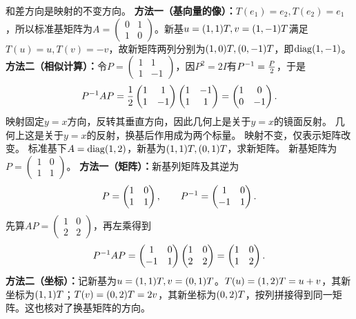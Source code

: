 {和差方向是映射的不变方向。}
{\textbf{方法一（基向量的像）：}$T(e_1)=e_2,T(e_2)=e_1$，所以标准基矩阵为$A=\begin{pmatrix}0&1\\1&0\end{pmatrix}$。新基$u=(1,1)T,v=(1,-1)T$满足$T(u)=u,T(v)=-v$，故新矩阵两列分别为$(1,0)T,(0,-1)T$，即$\operatorname{diag}(1,-1)$。
\textbf{方法二（相似计算）：}令$P=\begin{pmatrix}1&1\\1&-1\end{pmatrix}$，因$P^2=2I$有$P^{-1}=\frac{P}{2}$，于是
\[P^{-1} AP=\dfrac12\begin{pmatrix}1&1\\1&-1\end{pmatrix}
\begin{pmatrix}1&-1\\1&1\end{pmatrix}=\begin{pmatrix}1&0\\0&-1\end{pmatrix}.\]
映射固定$y=x$方向，反转其垂直方向，因此几何上是关于$y=x$的镜面反射。}
{几何上这是关于$y=x$的反射，换基后作用成为两个标量。}
{映射不变，仅表示矩阵改变。}
{标准基下$A=\operatorname{diag}(1,2)$，新基为$(1,1)T,(0,1)T$，求新矩阵。}
{新基矩阵为$P=\begin{pmatrix}1&0\\1&1\end{pmatrix}$。}
{\textbf{方法一（矩阵）：}新基列矩阵及其逆为
\[P=\begin{pmatrix}1&0\\1&1\end{pmatrix},\qquad
P^{-1}=\begin{pmatrix}1&0\\-1&1\end{pmatrix}.\]
先算$AP=\begin{pmatrix}1&0\\2&2\end{pmatrix}$，再左乘得到
\[P^{-1} AP=\begin{pmatrix}1&0\\-1&1\end{pmatrix}
\begin{pmatrix}1&0\\2&2\end{pmatrix}=\begin{pmatrix}1&0\\1&2\end{pmatrix}.\]
\textbf{方法二（坐标）：}记新基为$u=(1,1)T,v=(0,1)T$。$T(u)=(1,2)T=u+v$，其新坐标为$(1,1)T$；$T(v)=(0,2)T=2v$，其新坐标为$(0,2)T$，按列拼接得到同一矩阵。这也核对了换基矩阵的方向。}
